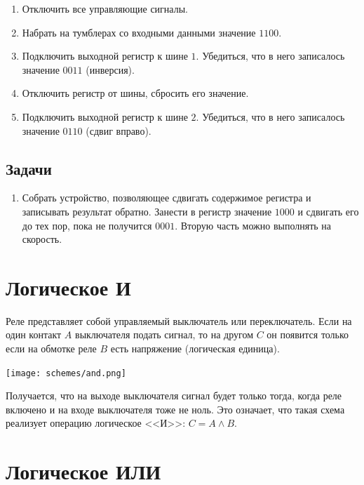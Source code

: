 \begin{enumerate}
    \item Отключить все управляющие сигналы.
    \item Набрать на тумблерах со входными данными значение $1100$.
    \item Подключить выходной регистр к шине $1$. Убедиться, что в него записалось значение $0011$ (инверсия).
    \item Отключить регистр от шины, сбросить его значение.
    \item Подключить выходной регистр к шине $2$. Убедиться, что в него записалось значение $0110$ (сдвиг вправо).
\end{enumerate}

\subsection{Задачи}

\begin{enumerate}
    \item Собрать устройство, позволяющее сдвигать содержимое регистра и записывать результат обратно.
          Занести в регистр значение $1000$ и сдвигать его до тех пор, пока не получится $0001$.
          Вторую часть можно выполнять на скорость.
\end{enumerate}


\section{Логическое И}

Реле представляет собой управляемый выключатель или переключатель.
Если на один контакт $A$ выключателя подать сигнал, то на другом $C$ он появится
только если на обмотке реле $B$ есть напряжение (логическая единица).

\begin{center}
\texttt{[image: schemes/and.png]}
\end{center}

Получается, что на выходе выключателя сигнал будет только тогда, когда
реле включено и на входе выключателя тоже не ноль. Это означает, что такая
схема реализует операцию логическое <<И>>: $C = A \land B$.



\section{Логическое ИЛИ}


